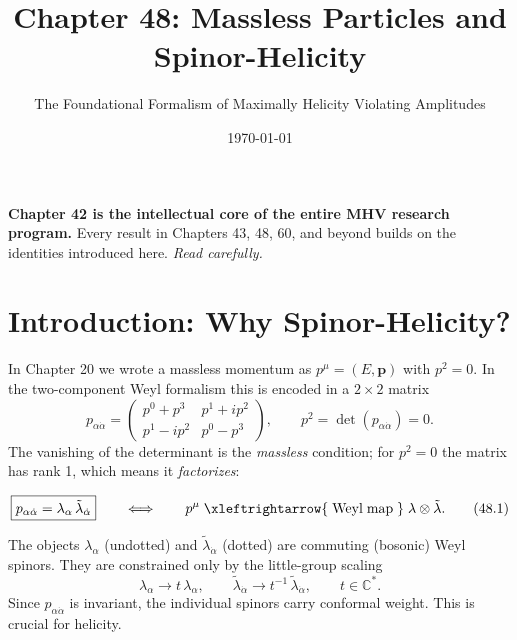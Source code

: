 \documentclass[12pt]{article}
\begin{document}
\title{Chapter 48: Massless Particles and Spinor-Helicity}
\subtitle{\large The Foundational Formalism of Maximally Helicity Violating Amplitudes}
\date{\today}
\maketitle

\begin{mdframed}[backgroundcolor=blue!5]
\textbf{Chapter 42 is the intellectual core of the entire MHV research program.}
Every result in Chapters 43, 48, 60, and beyond builds on the identities
introduced here. \emph{Read carefully.}
\end{mdframed}

\tableofcontents
\newpage

\section{Introduction: Why Spinor-Helicity?}

In Chapter 20 we wrote a massless momentum as $p^\mu=(E,\mathbf{p})$ with
$p^2=0$.  In the two-component Weyl formalism this is encoded in a
$2\times2$ matrix
\begin{equation}
p_{\alpha\dot\alpha}
= \begin{pmatrix} p^0+p^3 & p^1+ip^2 \\ p^1-ip^2 & p^0-p^3 \end{pmatrix},
\qquad p^2 = \det(p_{\alpha\dot\alpha}) = 0 .
\end{equation}
The vanishing of the determinant is the \emph{massless} condition; for $p^2=0$
the matrix has rank 1, which means it \emph{factorizes}:

\begin{mdframed}[backgroundcolor=green!5]
\begin{equation}
\boxed{p_{\alpha\dot\alpha}
= \lambda_\alpha\,\tilde\lambda_{\dot\alpha}}
\qquad\Longleftrightarrow\qquad
p^\mu \;\xleftrightarrow{\;\mathrm{Weyl\;map}\;}\;
\lambda\otimes\tilde\lambda .
\tag{48.1}
\end{equation}
\end{mdframed}

The objects $\lambda_\alpha$ (undotted) and $\tilde\lambda_{\dot\alpha}$
(dotted) are commuting (bosonic) Weyl spinors.  They are constrained only by the
little-group scaling
\begin{equation}
\lambda_\alpha\to t\,\lambda_\alpha,\qquad
\tilde\lambda_{\dot\alpha}\to t^{-1}\,\tilde\lambda_{\dot\alpha},
\qquad t\in\mathbb{C}^* .
\tag{48.2}
\end{equation}
Since $p_{\alpha\dot\alpha}$ is invariant, the individual spinors carry
conformal weight.  This is crucial for helicity.
\end{document}

